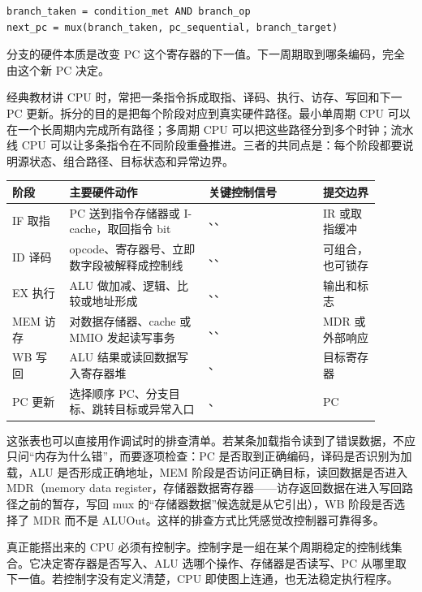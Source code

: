 \begin{lstlisting}
branch_taken = condition_met AND branch_op
next_pc = mux(branch_taken, pc_sequential, branch_target)
\end{lstlisting}

分支的硬件本质是改变 PC 这个寄存器的下一值。下一周期取到哪条编码，完全由这个新 PC 决定。

经典教材讲 CPU 时，常把一条指令拆成取指、译码、执行、访存、写回和下一 PC 更新。拆分的目的是把每个阶段对应到真实硬件路径。最小单周期 CPU 可以在一个长周期内完成所有路径；多周期 CPU 可以把这些路径分到多个时钟；流水线 CPU 可以让多条指令在不同阶段重叠推进。三者的共同点是：每个阶段都要说明源状态、组合路径、目标状态和异常边界。

\begin{longtable}{L{0.14\linewidth}L{0.34\linewidth}L{0.28\linewidth}L{0.14\linewidth}}
\toprule
阶段 & 主要硬件动作 & 关键控制信号 & 提交边界 \\
\midrule
IF 取指 & PC 送到指令存储器或 I-cache，取回指令 bit & 、、 & IR 或取指缓冲 \\\tablerowrule
ID 译码 & opcode、寄存器号、立即数字段被解释成控制线 & 、、 & 可组合，也可锁存 \\\tablerowrule
EX 执行 & ALU 做加减、逻辑、比较或地址形成 & 、、 & 输出和标志 \\\tablerowrule
MEM 访存 & 对数据存储器、cache 或 MMIO 发起读写事务 & 、、 & MDR 或外部响应 \\\tablerowrule
WB 写回 & ALU 结果或读回数据写入寄存器堆 & 、 & 目标寄存器 \\\tablerowrule
PC 更新 & 选择顺序 PC、分支目标、跳转目标或异常入口 & 、 & PC \\
\bottomrule
\end{longtable}

这张表也可以直接用作调试时的排查清单。若某条加载指令读到了错误数据，不应只问“内存为什么错”，而要逐项检查：PC 是否取到正确编码，译码是否识别为加载，ALU 是否形成正确地址，MEM 阶段是否访问正确目标，读回数据是否进入 MDR（memory data register，存储器数据寄存器——访存返回数据在进入写回路径之前的暂存，写回 mux 的“存储器数据”候选就是从它引出），WB 阶段是否选择了 MDR 而不是 ALUOut。这样的排查方式比凭感觉改控制器可靠得多。

真正能搭出来的 CPU 必须有控制字。控制字是一组在某个周期稳定的控制线集合。它决定寄存器是否写入、ALU 选哪个操作、存储器是否读写、PC 从哪里取下一值。若控制字没有定义清楚，CPU 即使图上连通，也无法稳定执行程序。

